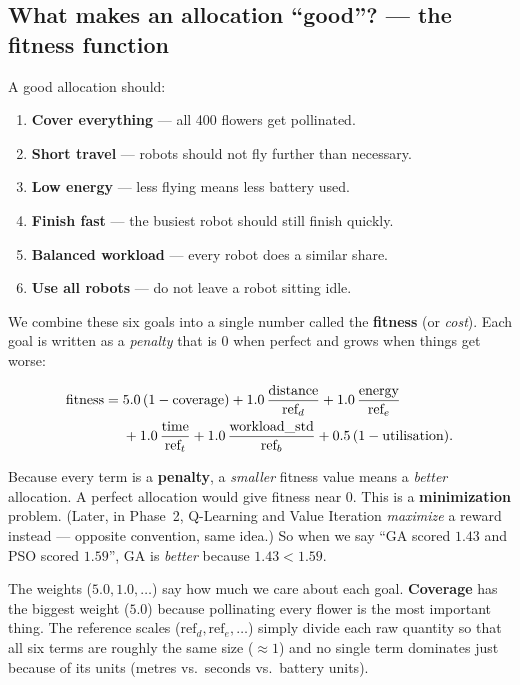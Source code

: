 \documentclass[11pt]{article}
\begin{document}
\subsection{What makes an allocation ``good''? --- the fitness function}

A good allocation should:
\begin{enumerate}[nosep]
  \item \textbf{Cover everything} --- all 400 flowers get pollinated.
  \item \textbf{Short travel} --- robots should not fly further than necessary.
  \item \textbf{Low energy} --- less flying means less battery used.
  \item \textbf{Finish fast} --- the busiest robot should still finish quickly.
  \item \textbf{Balanced workload} --- every robot does a similar share.
  \item \textbf{Use all robots} --- do not leave a robot sitting idle.
\end{enumerate}

We combine these six goals into a single number called the
\textbf{fitness} (or \emph{cost}). Each goal is written as a \emph{penalty}
that is $0$ when perfect and grows when things get worse:

\begin{align}
\text{fitness} =\; & 5.0\,(1-\text{coverage})
+ 1.0\,\frac{\text{distance}}{\text{ref}_d}
+ 1.0\,\frac{\text{energy}}{\text{ref}_e} \notag\\
& + 1.0\,\frac{\text{time}}{\text{ref}_t}
+ 1.0\,\frac{\text{workload\_std}}{\text{ref}_b}
+ 0.5\,(1-\text{utilisation}).
\label{eq:fitness}
\end{align}

\begin{tcolorbox}[colback=yellow!8!white,colframe=orange!60!black,title=Very important: lower fitness = better]
Because every term is a \textbf{penalty}, a \emph{smaller} fitness value means a
\emph{better} allocation. A perfect allocation would give fitness near $0$.
This is a \textbf{minimization} problem. (Later, in Phase~2, Q-Learning and
Value Iteration \emph{maximize} a reward instead --- opposite convention, same
idea.) So when we say ``GA scored $1.43$ and PSO scored $1.59$'', GA is
\emph{better} because $1.43 < 1.59$.
\end{tcolorbox}

The weights ($5.0, 1.0, \dots$) say how much we care about each goal.
\textbf{Coverage} has the biggest weight ($5.0$) because pollinating every
flower is the most important thing. The reference scales
($\text{ref}_d,\text{ref}_e,\dots$) simply divide each raw quantity so that all
six terms are roughly the same size ($\approx 1$) and no single term dominates
just because of its units (metres vs.\ seconds vs.\ battery units).
\end{document}
